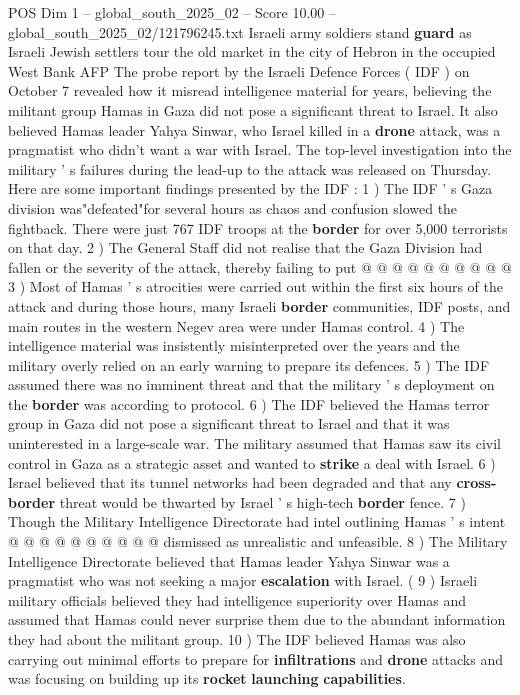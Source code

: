 \begin{textsample}{POS Dim 1 – global\_south\_2025\_02 – Score 10.00 – global\_south\_2025\_02/121796245.txt}  \label{ex:f1_pos_364}
Israeli army soldiers stand \textbf{guard} as Israeli Jewish settlers tour the old market in the city of Hebron in the occupied West Bank AFP The probe report by the Israeli Defence Forces ( IDF ) on October 7 revealed how it misread intelligence material for years, believing the militant group Hamas in Gaza did not pose a significant threat to Israel.
It also believed Hamas leader Yahya Sinwar, who Israel killed in a \textbf{drone} attack, was a pragmatist who didn't want a war with Israel.
The top-level investigation into the military ' s failures during the lead-up to the attack was released on Thursday.
Here are some important findings presented by the IDF : 1 ) The IDF ' s Gaza division was"defeated"for several hours as chaos and confusion slowed the fightback.
There were just 767 IDF troops at the \textbf{border} for over 5,000 terrorists on that day. 2 ) The General Staff did not realise that the Gaza Division had fallen or the severity of the attack, thereby failing to put @ @ @ @ @ @ @ @ @ @ 3 ) Most of Hamas ' s atrocities were carried out within the first six hours of the attack and during those hours, many Israeli \textbf{border} communities, IDF posts, and main routes in the western Negev area were under Hamas control. 4 ) The intelligence material was insistently misinterpreted over the years and the military overly relied on an early warning to prepare its defences. 5 ) The IDF assumed there was no imminent threat and that the military ' s deployment on the \textbf{border} was according to protocol. 6 ) The IDF believed the Hamas terror group in Gaza did not pose a significant threat to Israel and that it was uninterested in a large-scale war.
The military assumed that Hamas saw its civil control in Gaza as a strategic asset and wanted to \textbf{strike} a deal with Israel. 6 ) Israel believed that its tunnel networks had been degraded and that any \textbf{cross-border} threat would be thwarted by Israel ' s high-tech \textbf{border} fence. 7 ) Though the Military Intelligence Directorate had intel outlining Hamas ' s intent @ @ @ @ @ @ @ @ @ @ dismissed as unrealistic and unfeasible. 8 ) The Military Intelligence Directorate believed that Hamas leader Yahya Sinwar was a pragmatist who was not seeking a major \textbf{escalation} with Israel. ( 9 ) Israeli military officials believed they had intelligence superiority over Hamas and assumed that Hamas could never surprise them due to the abundant information they had about the militant group. 10 ) The IDF believed Hamas was also carrying out minimal efforts to prepare for \textbf{infiltrations} and \textbf{drone} attacks and was focusing on building up its \textbf{rocket} \textbf{launching} \textbf{capabilities}.

\end{textsample}
